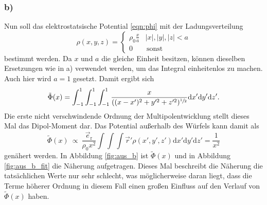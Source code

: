 \subsubsection*{b)}

Nun soll das elektrostatsische Potential \eqref{eqn:phi} mit der Ladungsverteilung
\begin{equation*}
  \rho(x, y, z) = \begin{cases}
  \rho_0 \frac{x}{a} & |x|,|y|,|z| < a \\
  0 &\, \text{sonst}
  \end{cases}
\end{equation*}
bestimmt werden. Da \(x\) und \(a\) die gleiche Einheit besitzen, können dieselben Ersetzungen wie in a) verwendet werden, um das Integral einheitenlos zu machen. Auch hier wird \(a=1\) gesetzt.
Damit ergibt sich
\begin{equation*}
  \tilde{\Phi}(x) = \int_{-1}^1 \int_{-1}^1 \int_{-1}^1 \frac{x}{((x-x')^2+y'^2+z'^2)^{\sfrac{1}{2}}} \mathrm{d}x'\mathrm{d}y'\mathrm{d}z'.
\end{equation*}
Die erste nicht verschwindende Ordnung der Multipolentwicklung stellt dieses Mal das Dipol-Moment dar. Das Potential außerhalb des Würfels kann damit als
\begin{equation*}
  \tilde{\Phi}(x) \: \propto \: \frac{\vec{e}_\text{r}}{\rho_0 x^2} \int \int \int \vec{r}' \rho(x', y', z') \mathrm{d}x'\mathrm{d}y'\mathrm{d}z' = \frac{1}{x^2}
\end{equation*}
genähert werden.
In Abbildung \ref{fig:aus_b} ist \(\tilde{\Phi}(x)\) und in Abbildung \ref{fig:aus_b_fit} die Näherung aufgetragen. Dieses Mal beschreibt die Näherung die tatsächlichen Werte nur sehr schlecht, was möglicherweise daran liegt, dass die Terme höherer Ordnung in diesem Fall einen großen Einfluss auf den Verlauf von \(\tilde{\Phi}(x)\) haben.
